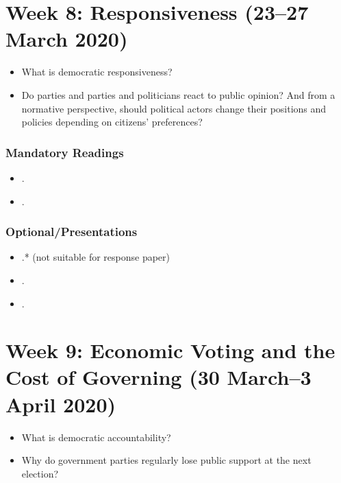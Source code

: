 \documentclass[abstract=on,parskip=full,headings=standardclasses,fontsize=11pt,paper=a4]{scrartcl}
\begin{document}
\section{Week 8:  Responsiveness (23--27 March 2020)}

\begin{itemize}
\renewcommand\labelitemi{--}
\item What is democratic responsiveness?
\item Do parties and parties and politicians react to public opinion?  And from a normative perspective, should political actors change their positions and policies depending on citizens' preferences?
\end{itemize}

\subsubsection*{Mandatory Readings}
\begin{itemize}
\item {}.
\item {}.
\end{itemize}

\subsubsection*{Optional/Presentations}
\begin{itemize}
\item {}.* (not suitable for response paper)
\item {}.
\item {}.
\end{itemize}


\section{Week 9: Economic Voting and the Cost of Governing (30 March--3 April 2020)}


\begin{itemize}
\renewcommand\labelitemi{--}
\item What is democratic accountability?
\item Why do government parties  regularly lose public support at the next election?
\end{itemize}
\end{document}

